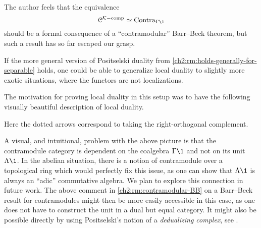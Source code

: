 \begin{remark}
    \label{ch2:rm:contramodular-BB}
    The author feels that the equivalence 
    \[\C\Kcomp\simeq \Contra_{\Gamma\1}\] 
    should be a formal consequence of a ``contramodular'' Barr--Beck theorem, but such a result has so far escaped our grasp. 
\end{remark}

\begin{remark}
    If the more general version of Positselski duality from \cref{ch2:rm:holds-generally-for-separable} holds, one could be able to generalize local duality to slightly more exotic situations, where the functors are not localizations. 
\end{remark}

The motivation for proving local duality in this setup was to have the following visually beautiful description of local duality. 

\begin{center}
\end{center}

Here the dotted arrows correspond to taking the right-orthogonal complement. 

\begin{remark}
    \label{ch2:rm:contramodule-over-pro-ring}
    A visual, and intuitional, problem with the above picture is that the contramodule category is dependent on the coalgebra $\Gamma\1$ and not on its unit $\Lambda \1$. In the abelian situation, there is a notion of contramodule over a topological ring which would perfectly fix this issue, as one can show that $\Lambda \1$ is always an ``adic'' commutative algebra. We plan to explore this connection in future work. The above comment in \cref{ch2:rm:contramodular-BB} on a Barr--Beck result for contramodules might then be more easily accessible in this case, as one does not have to construct the unit in a dual but equal category. It might also be possible directly by using Positselski's notion of a \emph{dedualizing complex}, see \cite{positselski_2016}. 
\end{remark}

